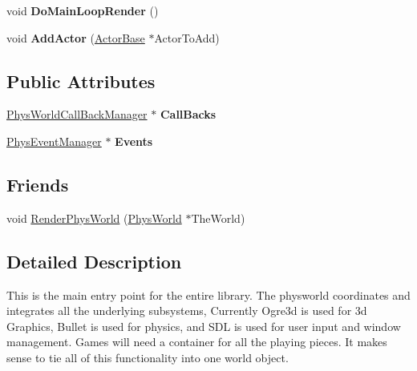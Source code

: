 \begin{DoxyCompactItemize}
\item 
\hypertarget{classPhysWorld_a8f33541d67164a2452e568443e9905be}{
void {\bfseries DoMainLoopRender} ()}
\label{db/df5/classPhysWorld_a8f33541d67164a2452e568443e9905be}

\item 
\hypertarget{classPhysWorld_ae490054b3e1c4c5aa69cb8e3b7bd2f29}{
void {\bfseries AddActor} (\hyperlink{classActorBase}{ActorBase} $\ast$ActorToAdd)}
\label{db/df5/classPhysWorld_ae490054b3e1c4c5aa69cb8e3b7bd2f29}

\end{DoxyCompactItemize}
\subsection*{Public Attributes}
\begin{DoxyCompactItemize}
\item 
\hypertarget{classPhysWorld_a080ea6f1584374b07d3c1f29c7ed64df}{
\hyperlink{classPhysWorldCallBackManager}{PhysWorldCallBackManager} $\ast$ {\bfseries CallBacks}}
\label{db/df5/classPhysWorld_a080ea6f1584374b07d3c1f29c7ed64df}

\item 
\hypertarget{classPhysWorld_a601b3c6093aaf2a69fcd3311dde9aadc}{
\hyperlink{classPhysEventManager}{PhysEventManager} $\ast$ {\bfseries Events}}
\label{db/df5/classPhysWorld_a601b3c6093aaf2a69fcd3311dde9aadc}

\end{DoxyCompactItemize}
\subsection*{Friends}
\begin{DoxyCompactItemize}
\item 
void \hyperlink{classPhysWorld_a54ca2a75bbccb9b2129f434874f1e693}{RenderPhysWorld} (\hyperlink{classPhysWorld}{PhysWorld} $\ast$TheWorld)
\end{DoxyCompactItemize}


\subsection{Detailed Description}
This is the main entry point for the entire library. The physworld coordinates and integrates all the underlying subsystems, Currently Ogre3d is used for 3d Graphics, Bullet is used for physics, and SDL is used for user input and window management. Games will need a container for all the playing pieces. It makes sense to tie all of this functionality into one world object. 

